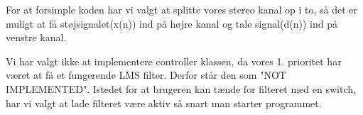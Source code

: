 For at forsimple koden har vi valgt at splitte vores stereo kanal op i to, så det er muligt at få støjsignalet(x(n)) ind på højre kanal og tale signal(d(n)) ind på venstre kanal.

Vi har valgt ikke at implementere controller klassen, da vores 1. prioritet har været at få et fungerende LMS filter. Derfor står den som "NOT IMPLEMENTED". Istedet for at brugeren kan tænde for filteret med en switch, har vi valgt at lade filteret være aktiv så snart man starter programmet. 